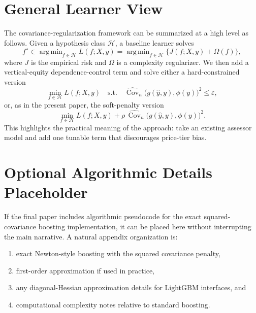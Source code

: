 \documentclass[12pt]{article}
\theoremstyle{plain}
\theoremstyle{definition}
\newcommand{\Cov}{\operatorname{Cov}}
\newcommand{\argmin}{\mathop{\mathrm{arg\,min}}}
\begin{document}
\section{General Learner View}

The covariance-regularization framework can be summarized at a high level as follows. Given a hypothesis class \(\mathcal H\), a baseline learner solves
\[
f^\star\in\argmin_{f\in\mathcal H}L(f;X,y)=\argmin_{f\in\mathcal H}\{J(f;X,y)+\Omega(f)\},
\]
where \(J\) is the empirical risk and \(\Omega\) is a complexity regularizer. We then add a vertical-equity dependence-control term and solve either a hard-constrained version
\[
\min_{f\in\mathcal H}L(f;X,y)\quad\text{s.t.}\quad
\widehat{\Cov}_n\!\bigl(g(\hat y,y),\phi(y)\bigr)^2\le \varepsilon,
\]
or, as in the present paper, the soft-penalty version
\[
\min_{f\in\mathcal H}L(f;X,y)+\rho\,\widehat{\Cov}_n\!\bigl(g(\hat y,y),\phi(y)\bigr)^2.
\]
This highlights the practical meaning of the approach: take an existing assessor model and add one tunable term that discourages price-tier bias.

\section{Optional Algorithmic Details Placeholder}

If the final paper includes algorithmic pseudocode for the exact squared-covariance boosting implementation, it can be placed here without interrupting the main narrative. A natural appendix organization is:
\begin{enumerate}[leftmargin=1.5em]
    \item exact Newton-style boosting with the squared covariance penalty,
    \item first-order approximation if used in practice,
    \item any diagonal-Hessian approximation details for LightGBM interfaces, and
    \item computational complexity notes relative to standard boosting.
\end{enumerate}

\printbibliography
\end{document}
